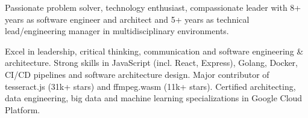 

\begin{cvparagraph}

Passionate problem solver, technology enthusiast, compassionate leader with 8+ years as software engineer and architect and 5+ years as technical lead/engineering manager in multidisciplinary environments.

Excel in leadership, critical thinking, communication and software engineering \& architecture. Strong skills in JavaScript (incl. React, Express), Golang, Docker, CI/CD pipelines and software architecture design. Major contributor of tesseract.js (31k+ stars) and ffmpeg.wasm (11k+ stars). Certified architecting, data engineering, big data and machine learning specializations in Google Cloud Platform.
\end{cvparagraph}
